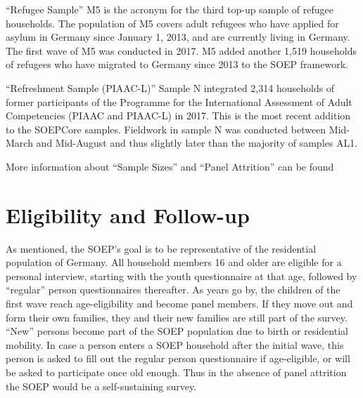 \documentclass[letterpaper,10pt,openany,onesideH,english]{sphinxmanual}
\begin{document}
 “Refugee Sample” M5 is the acronym for the third top-up sample of refugee households. The population of M5 covers adult refugees who have applied for asylum in Germany since January 1, 2013, and are currently living in Germany. The first wave of M5 was conducted in 2017. M5 added another 1,519 households of refugees who have migrated to Germany since 2013 to the SOEP framework.

 “Refreshment Sample (PIAAC-L)” Sample N integrated 2,314 households of former participants of the Programme for the International Assessment of Adult Competencies (PIAAC and PIAAC-L) in 2017. This is the most recent addition to the SOEPCore samples. Fieldwork in sample N was conducted between Mid-March and Mid-August and thus slightly later than the majority of samples A\textendash{}L1.

More information about “Sample Sizes” and “Panel Attrition” can be found 

\begin{figure}[H]
\centering

\noindent{}
\end{figure}


\section{Eligibility and Follow-up}
\label{\detokenize{Target Population and Samples/index:eligibility-and-follow-up}}
As mentioned, the SOEP’s goal is to be representative of the residential population of Germany. All household members 16 and older are eligible for a personal interview, starting with the youth questionnaire at that age, followed by “regular” person questionnaires thereafter. As years go by, the children of the first wave reach age-eligibility and become panel members. If they move out and form their own families, they and their new families are still part of the survey. “New” persons become part of the SOEP population due to birth or residential mobility. In case a person enters a SOEP household after the initial wave, this person is asked to fill out the regular person questionnaire if age-eligible, or will be asked to participate once old enough. Thus in the absence of panel attrition the SOEP would be a self-sustaining survey.
\end{document}
